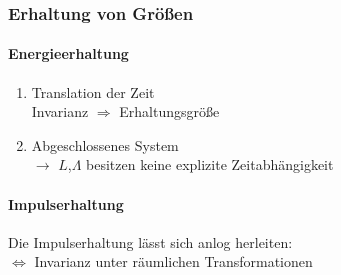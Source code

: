 \documentclass[a4paper]{article}
\begin{document}
\subsubsection{Erhaltung von Größen}
\paragraph{Energieerhaltung}
\begin{enumerate}
  \item Translation der Zeit \\ Invarianz $\Rightarrow$ Erhaltungsgröße
  \item Abgeschlossenes System \\ $\rightarrow$ $L$,$\Lambda$ besitzen keine
  explizite Zeitabhängigkeit
\end{enumerate}
\paragraph{Impulserhaltung} 
Die Impulserhaltung lässt sich anlog herleiten:\\
$\Leftrightarrow$ Invarianz unter räumlichen Transformationen
\end{document}
